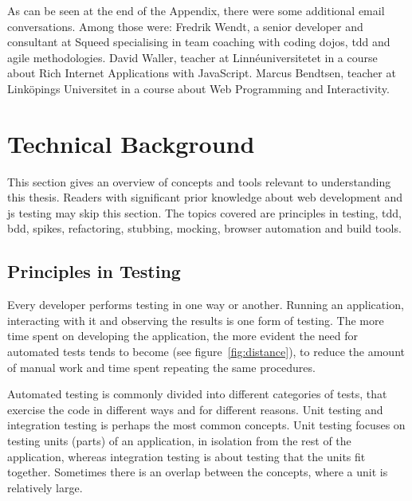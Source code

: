 \documentclass[11pt]{article}
\begin{document}
As can be seen at the end of the Appendix, there were some additional email conversations. Among those were: Fredrik Wendt, a senior developer and consultant at Squeed specialising in team coaching with coding dojos, \gls{tdd} and agile methodologies. David Waller, teacher at Linnéuniversitetet in a course about Rich Internet Applications with JavaScript. Marcus Bendtsen, teacher at Linköpings Universitet in a course about Web Programming and Interactivity.


\section{Technical Background}
\label{sec:technicalbackground}

This section gives an overview of concepts and tools relevant to understanding this thesis. Readers with significant prior knowledge about web development and \gls{js} testing may skip this section. The topics covered are principles in testing, \gls{tdd}, \gls{bdd}, spikes, refactoring, stubbing, mocking, browser automation and build tools.

\subsection{Principles in Testing}
\label{subsec:testingbasics}

Every developer performs testing in one way or another. Running an application, interacting with it and observing the results is one form of testing. The more time spent on developing the application, the more evident the need for automated tests tends to become (see figure~\ref{fig:distance}), to reduce the amount of manual work and time spent repeating the same procedures.

Automated testing is commonly divided into different categories of tests, that exercise the code in different ways and for different reasons. Unit testing and integration testing is perhaps the most common concepts. Unit testing focuses on testing units (parts) of an application, in isolation from the rest of the application, whereas integration testing is about testing that the units fit together. Sometimes there is an overlap between the concepts, where a unit is relatively large.
\end{document}
